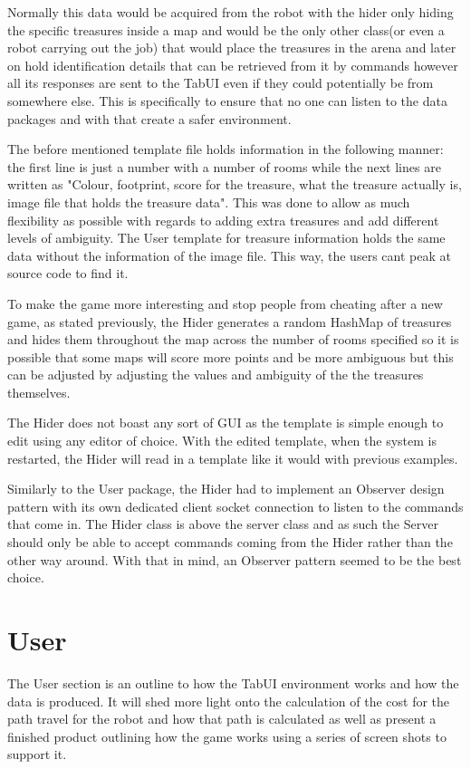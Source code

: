     Normally this data would be acquired from the robot with the hider only hiding the specific treasures inside a map and would be the only other class(or even a robot carrying out the job) that would place the treasures in the arena and later on hold identification details that can be retrieved from it by commands however all its responses are sent to the TabUI even if they could potentially be from somewhere else. This is specifically to ensure that no one can listen to the data packages and with that create a safer environment.

    The before mentioned template file holds information in the following manner: the first line is just a number with a number of rooms while the next lines are written as "Colour, footprint, score for the treasure, what the treasure actually is, image file that holds the treasure data". This was done to allow as much flexibility as possible with regards to adding extra treasures and add different levels of ambiguity. The User template for treasure information holds the same data without the information of the image file. This way, the users cant peak at source code to find it.

    To make the game more interesting and stop people from cheating after a new game, as stated previously, the Hider generates a random HashMap of treasures and hides them throughout the map across the number of rooms specified so it is possible that some maps will score more points and be more ambiguous but this can be adjusted by adjusting the values and ambiguity of the the treasures themselves.

    The Hider does not boast any sort of GUI as the template is simple enough to edit using any editor of choice. With the edited template, when the system is restarted, the Hider will read in a template like it would with previous examples.

    Similarly to the User package, the Hider had to implement an Observer design pattern with its own dedicated client socket connection to listen to the commands that come in. The Hider class is above the server class and as such the Server should only be able to accept commands coming from the Hider rather than the other way around. With that in mind, an Observer pattern seemed to be the best choice.

  \section{User}
    The User section is an outline to how the TabUI environment works and how the data is produced. It will shed more light onto the calculation of the cost for the path travel for the robot and how that path is calculated as well as present a finished product outlining how the game works using a series of screen shots to support it.

